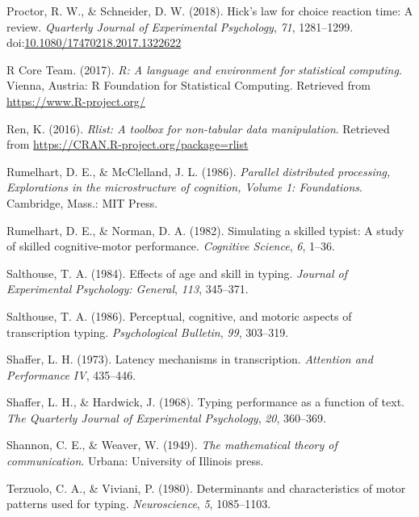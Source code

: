 \documentclass[floatsintext,man]{apa6}
\theoremstyle{definition}
\theoremstyle{definition}
\theoremstyle{definition}
\theoremstyle{remark}
\begin{document}
\hypertarget{ref-proctor_hicks_2018}{}
Proctor, R. W., \& Schneider, D. W. (2018). Hick's law for choice
reaction time: A review. \emph{Quarterly Journal of Experimental
Psychology}, \emph{71}, 1281--1299.
doi:\href{https://doi.org/10.1080/17470218.2017.1322622}{10.1080/17470218.2017.1322622}

\hypertarget{ref-R-base}{}
R Core Team. (2017). \emph{R: A language and environment for statistical
computing}. Vienna, Austria: R Foundation for Statistical Computing.
Retrieved from \url{https://www.R-project.org/}

\hypertarget{ref-R-rlist}{}
Ren, K. (2016). \emph{Rlist: A toolbox for non-tabular data
manipulation}. Retrieved from
\url{https://CRAN.R-project.org/package=rlist}

\hypertarget{ref-rumelhart_parallel_1986}{}
Rumelhart, D. E., \& McClelland, J. L. (1986). \emph{Parallel
distributed processing, Explorations in the microstructure of cognition,
Volume 1: Foundations}. Cambridge, Mass.: MIT Press.

\hypertarget{ref-RumelhartSimulatingskilledtypist1982}{}
Rumelhart, D. E., \& Norman, D. A. (1982). Simulating a skilled typist:
A study of skilled cognitive-motor performance. \emph{Cognitive
Science}, \emph{6}, 1--36.

\hypertarget{ref-salthouse_effects_1984}{}
Salthouse, T. A. (1984). Effects of age and skill in typing.
\emph{Journal of Experimental Psychology: General}, \emph{113},
345--371.

\hypertarget{ref-salthouse_perceptual_1986}{}
Salthouse, T. A. (1986). Perceptual, cognitive, and motoric aspects of
transcription typing. \emph{Psychological Bulletin}, \emph{99},
303--319.

\hypertarget{ref-shaffer_latency_1973}{}
Shaffer, L. H. (1973). Latency mechanisms in transcription.
\emph{Attention and Performance IV}, 435--446.

\hypertarget{ref-shaffer_typing_1968}{}
Shaffer, L. H., \& Hardwick, J. (1968). Typing performance as a function
of text. \emph{The Quarterly Journal of Experimental Psychology},
\emph{20}, 360--369.

\hypertarget{ref-Shannonmathematicaltheorycommunication1949}{}
Shannon, C. E., \& Weaver, W. (1949). \emph{The mathematical theory of
communication}. Urbana: University of Illinois press.

\hypertarget{ref-terzuolo_determinants_1980}{}
Terzuolo, C. A., \& Viviani, P. (1980). Determinants and characteristics
of motor patterns used for typing. \emph{Neuroscience}, \emph{5},
1085--1103.
\end{document}
